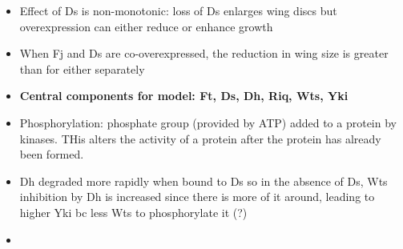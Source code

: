 \documentclass[12pt]{article}
\begin{document}
\begin{enumerate}
\begin{itemize}
	\item Effect of Ds is non-monotonic: loss of Ds enlarges wing discs but overexpression can either reduce or enhance growth 
	\item When Fj and Ds are co-overexpressed, the reduction in wing size is greater than for either separately
	\item \textbf{Central components for model: Ft, Ds, Dh, Riq, Wts, Yki}
	\item Phosphorylation: phosphate group (provided by ATP) added to a protein by kinases. THis alters the activity of a protein after the protein has already been formed. 
	\item Dh degraded more rapidly when bound to Ds so in the absence of Ds, Wts inhibition by Dh is increased since there is more of it around, leading to higher Yki bc less Wts to phosphorylate it (?)
	\item 
\end{itemize}
\end{enumerate}
\end{document}
